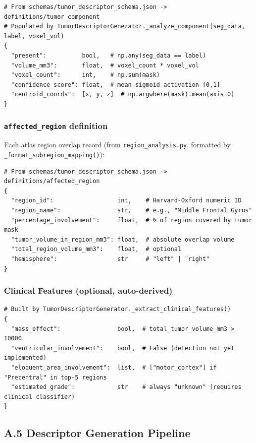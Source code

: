 \documentclass[conference]{IEEEtran}
\begin{document}
\begin{lstlisting}[style=pycode]
# From schemas/tumor_descriptor_schema.json -> definitions/tumor_component
# Populated by TumorDescriptorGenerator._analyze_component(seg_data, label, voxel_vol)
{
  "present":          bool,   # np.any(seg_data == label)
  "volume_mm3":       float,  # voxel_count * voxel_vol
  "voxel_count":      int,    # np.sum(mask)
  "confidence_score": float,  # mean sigmoid activation [0,1]
  "centroid_coords":  [x, y, z]  # np.argwhere(mask).mean(axis=0)
}
\end{lstlisting}

\subsubsection*{\texttt{affected\_region} definition}
Each atlas region overlap record (from \texttt{region\_analysis.py}, formatted by \texttt{\_format\_subregion\_mapping()}):

\begin{lstlisting}[style=pycode]
# From schemas/tumor_descriptor_schema.json -> definitions/affected_region
{
  "region_id":                  int,    # Harvard-Oxford numeric ID
  "region_name":                str,    # e.g., "Middle Frontal Gyrus"
  "percentage_involvement":     float,  # % of region covered by tumor mask
  "tumor_volume_in_region_mm3": float,  # absolute overlap volume
  "total_region_volume_mm3":    float,  # optional
  "hemisphere":                 str     # "left" | "right"
}
\end{lstlisting}

\subsubsection*{Clinical Features (optional, auto-derived)}
\begin{lstlisting}[style=pycode]
# Built by TumorDescriptorGenerator._extract_clinical_features()
{
  "mass_effect":                bool,  # total_tumor_volume_mm3 > 10000
  "ventricular_involvement":    bool,  # False (detection not yet implemented)
  "eloquent_area_involvement":  list,  # ["motor_cortex"] if "Precentral" in top-5 regions
  "estimated_grade":            str    # always "unknown" (requires clinical classifier)
}
\end{lstlisting}

\subsection*{A.5 Descriptor Generation Pipeline}
\end{document}
